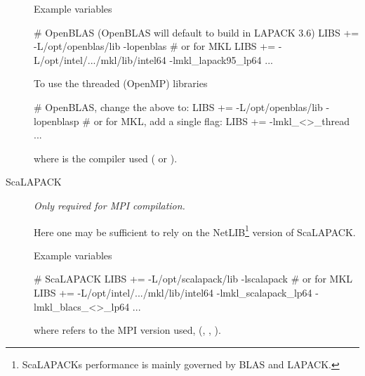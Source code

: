 \begin{description}
  Example variables
\begin{shellexample}
  # OpenBLAS (OpenBLAS will default to build in LAPACK 3.6)
  LIBS += -L/opt/openblas/lib -lopenblas
  # or for MKL
  LIBS += -L/opt/intel/.../mkl/lib/intel64 -lmkl_lapack95_lp64 ...
\end{shellexample}

  To use the threaded (OpenMP) libraries
\begin{shellexample}
  # OpenBLAS, change the above to:
  LIBS += -L/opt/openblas/lib -lopenblasp
  # or for MKL, add a single flag:
  LIBS += -lmkl_<>_thread ...
\end{shellexample}
  where \shell{<>} is the compiler used ( or ).


  \item[ScaLAPACK]%
  \emph{Only required for MPI compilation.}

  Here one may be sufficient to rely on the NetLIB\footnote{ScaLAPACKs
      performance is mainly governed by BLAS and LAPACK.} version of
  ScaLAPACK. 

  Example variables
\begin{shellexample}
  # ScaLAPACK
  LIBS += -L/opt/scalapack/lib -lscalapack
  # or for MKL
  LIBS += -L/opt/intel/.../mkl/lib/intel64 -lmkl_scalapack_lp64 
           -lmkl_blacs_<>_lp64 ...
\end{shellexample}
where \shell{<>} refers to the MPI version used, (,
, ).

\end{description}

